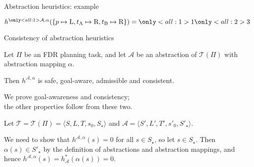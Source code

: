 \documentclass{gkibeamer}
\begin{document}
\begin{frame}{Abstraction heuristics: example}
  \begin{center}%

    \medskip

    \alert{$h^{\only<all:1>{\mathcal A, }\alpha}(
      \{p \mapsto \val{L}, t_\val{A} \mapsto \val{R},
        t_\val{B} \mapsto \val{R}\}) = \only<all:1>{1}\only<all:2>{3}$}
  \end{center}
\end{frame}

\begin{frame}{Consistency of abstraction heuristics}
  \begin{theorem}
    Let $\Pi$ be an FDR planning task, and let $\mathcal A$ be an
    abstraction of $\mathcal T(\Pi)$ with abstraction mapping
    $\alpha$.

    Then $h^{\mathcal A, \alpha}$ is safe, goal-aware, admissible and
    consistent.
  \end{theorem}

  \begin{proofstart}
    We prove goal-awareness and consistency; \\
    the other properties follow from these two.

    \smallskip

    Let $\mathcal T = \mathcal T(\Pi) = \langle S, L, T, s_0, S_\star\rangle$
    and $\mathcal A = \langle S', L', T', s'_0, S'_\star\rangle$.

    \smallskip

    \pause

     We need to show that $h^{\mathcal A,
      \alpha}(s) = 0$ for all $s \in S_\star$, so let $s \in S_\star$.
    Then $\alpha(s) \in S'_\star$ by the definition of abstractions and
    abstraction mappings, and hence $h^{\mathcal A, \alpha}(s) =
    h^*_{\mathcal A}(\alpha(s)) = 0$.
  \end{proofstart}
\end{frame}
\end{document}
